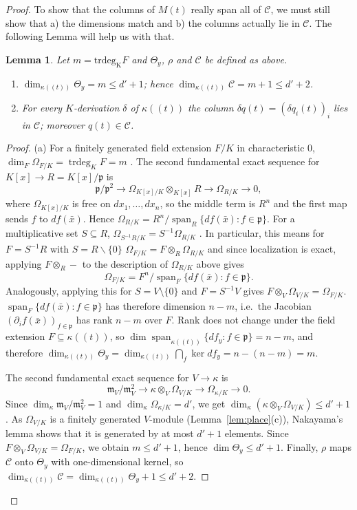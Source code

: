 \documentclass[pdflatex,sn-mathphys-num]{sn-jnl}
\numberwithin{equation}{section}
\theoremstyle{thmstyleone}
\newtheorem{lemma}[theorem]{Lemma}
\theoremstyle{thmstyletwo}
\begin{document}
\begin{proof}
To show that the columns of $M(t)$ really span all of $\mathcal C$, we must still show that a) the dimensions match and b) the columns actually lie in $\mathcal C$. The following Lemma will help us with that.
\begin{lemma}\label{lem:tangent}
Let $m = \operatorname{trdeg_K}F$ and  $\Theta_y$, $\rho$ and $\mathcal C$ be defined as above.
\begin{enumerate}[label=(\alph*)]
\item $\dim_{\kappa((t))}\Theta_y = m \le {d'}+1$; hence $\dim_{\kappa((t))}\mathcal C = m + 1 \le {d'}+2$.
\item For every $K$-derivation $\delta$ of $\kappa((t))$ the column
$\delta q(t)=(\delta q_i(t))_i$ lies in $\mathcal C$; moreover $q(t)\in\mathcal C$.
\end{enumerate}
\end{lemma}
\begin{proof}
(a) For a finitely generated field extension $F/K$ in characteristic $0$, $\dim_F\Omega_{F/K}=\operatorname{trdeg}_KF = m$ \cite[Thm.~II.8.6A]{hartshorne}.
The second fundamental exact sequence \cite[Theorem 25.2]{matsumura} for $K[x]\to R=K[x]/\mathfrak p$ is
\[\mathfrak p/\mathfrak p^2\to\Omega_{K[x]/K}\otimes_{K[x]}R\to\Omega_{R/K}\to0 ,\]
where $\Omega_{K[x]/K}$ is free on $dx_1,\dots,dx_n$, so the middle term is $R^n$
and the first map sends $f$ to $df(\bar x)$. Hence
$\Omega_{R/K}=R^n/\operatorname{span}_R\{df(\bar x):f\in\mathfrak p\}$.
For a multiplicative set $S\subseteq R$, $\Omega_{S^{-1}R/K}=S^{-1}\Omega_{R/K}$ \cite[Prop II.8.2A]{hartshorne}. In particular, this means for $F=S^{-1}R$ with
$S=R\smallsetminus\{0\}$ $\Omega_{F/K}=F\otimes_R\Omega_{R/K}$ and since localization is exact, applying $F\otimes_R-$ to the description of
$\Omega_{R/K}$ above gives
\[ \Omega_{F/K}=F^n/\operatorname{span}_F\{df(\bar x):f\in\mathfrak p\}.\]
Analogously, applying this for $S = V\setminus \{0\}$ and $F=S^{-1}V$ gives $F\otimes_V\Omega_{V/K}=\Omega_{F/K}$.
$\operatorname{span}_F\{df(\bar x):f\in\mathfrak p\}$ has therefore dimension $n-m$,
i.e.\ the Jacobian $(\partial_if(\bar x))_{f\in\mathfrak p}$ has rank $n-m$ over $F$.
Rank does not change under the field extension $F\subseteq\kappa((t))$, so
$\dim\operatorname{span}_{\kappa((t))}\{df_y:f\in\mathfrak p\}=n-m$, and therefore
$\dim_{\kappa((t))}\Theta_y=\dim_{\kappa((t))}\bigcap_f\ker df_y=n-(n-m)=m$.

The second fundamental exact sequence for $V\to\kappa$ is
\[ \mathfrak m_V/\mathfrak m_V^2\to\kappa\otimes_V\Omega_{V/K}\to\Omega_{\kappa/K}\to0 .\]
Since $\dim_\kappa\mathfrak m_V/\mathfrak m_V^2=1$ and
$\dim_\kappa\Omega_{\kappa/K}=d'$, we get
$\dim_\kappa(\kappa\otimes_V\Omega_{V/K})\le d'+1$. As $\Omega_{V/K}$ is a finitely
generated $V$-module (Lemma~\ref{lem:place}(c)), Nakayama's lemma shows that it is
generated by at most $d'+1$ elements. Since $F\otimes_V\Omega_{V/K}=\Omega_{F/K}$,
we obtain $m\le d'+1$, hence $\dim\Theta_y\le d'+1$. Finally, $\rho$ maps
$\mathcal C$ onto $\Theta_y$ with one-dimensional kernel, so
$\dim_{\kappa((t))}\mathcal C=\dim_{\kappa((t))}\Theta_y+1\le d'+2$.



\end{proof}
\end{proof}
\end{document}

